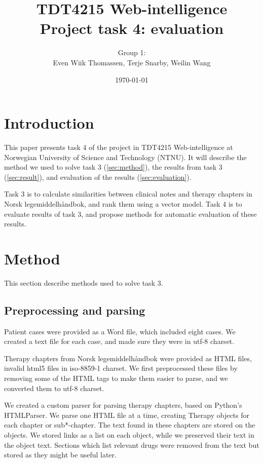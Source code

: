 \documentclass[a4paper, 11pt]{article}
\title{TDT4215 Web-intelligence\\Project task 4: evaluation}
\author{Group 1:\\Even Wiik Thomassen, Terje Snarby, Weilin Wang}
\date{\today}
\begin{document}

\maketitle
\tableofcontents


\section{Introduction}
This paper presents task 4 of the project in TDT4215 Web-intelligence at
Norwegian University of Science and Technology (NTNU). It will
describe the method we used to solve task 3 (\autoref{sec:method}),
the results from task 3 (\autoref{sec:result}),
and evaluation of the results (\autoref{sec:evaluation}).

Task 3 is to calculate similarities between clinical notes and therapy
chapters in Norsk legemiddelhåndbok, and rank them using a vector model.
Task 4 is to evaluate results of task 3, and propose methods for automatic
evaluation of these results.


\section{Method}
\label{sec:method}
This section describe methods used to solve task 3.

\subsection{Preprocessing and parsing}
Patient cases were provided as a Word file, which included eight cases. We
created a text file for each case, and made sure they were in utf-8 charset.

Therapy chapters from Norsk legemiddelhåndbok were provided as HTML files,
invalid html5 files in iso-8859-1 charset. We first preprocessed these files
by removing some of the HTML tags to make them easier to parse, and we
converted them to utf-8 charset.

We created a custom parser for parsing therapy chapters, based on Python's
HTMLParser. We parse one HTML file at a time, creating Therapy objects for
each chapter or sub*-chapter. The text found in these chapters are stored
on the objects. We stored links as a list on each object, while we preserved
their text in the object text. Sections which list relevant drugs were removed
from the text but stored as they might be useful later.
\end{document}
